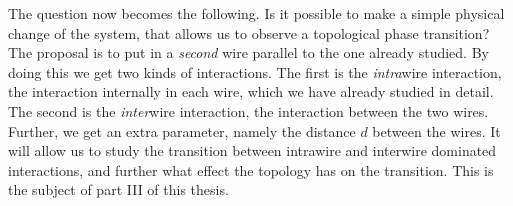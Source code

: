 The question now becomes the following. Is it possible to make a simple physical change of the system, that allows us to observe a topological phase transition? The proposal is to put in a \textit{second} wire parallel to the one already studied. By doing this we get two kinds of interactions. The first is the \textit{intra}wire interaction, the interaction internally in each wire, which we have already studied in detail. The second is the \textit{inter}wire interaction, the interaction between the two wires. Further, we get an extra parameter, namely the distance $d$ between the wires. It will allow us to study the transition between intrawire and interwire dominated interactions, and further what effect the topology has on the transition. This is the subject of part III of this thesis. 

